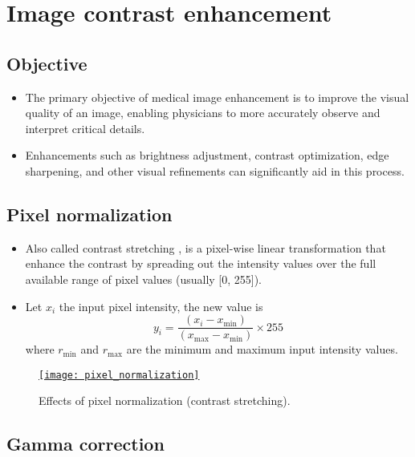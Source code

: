 \chapter{Image contrast enhancement}

\section{Objective}
\begin{itemize}
\item The primary objective of medical image enhancement is to improve
  the visual quality of an image, enabling physicians to more
  accurately observe and interpret critical details.
\item Enhancements such as brightness adjustment, contrast
  optimization, edge sharpening, and other visual refinements can
  significantly aid in this process.
\end{itemize}

\section{Pixel normalization}
\begin{itemize}
\item Also called contrast stretching \cite{gonzalez2009digital}, is a
  pixel-wise linear transformation that enhance the contrast by
  spreading out the intensity values over the full available range of
  pixel values (usually [0, 255]).
\item Let $x_i$ the input pixel intensity, the new value is
  \begin{equation}
    y_i = \frac{(x_i - x_{\min})}{(x_{\max} - x_{\min})} \times 255
  \end{equation}
  where $r_{\text{min}}$ and $r_{\text{max}}$ are the minimum and
  maximum input intensity values.
\end{itemize}

\begin{figure}[H]
  \vspace{-0ex}
  \centering
  \href{https://github.com/vicente-gonzalez-ruiz/medical_imaging/blob/main/notebooks/pixel_normalization.ipynb}{\texttt{[image: pixel\_normalization]}}
  \caption{Effects of pixel normalization (contrast stretching).}
  \label{fig:pixel_normalization}
\end{figure}

\section{Gamma correction}

